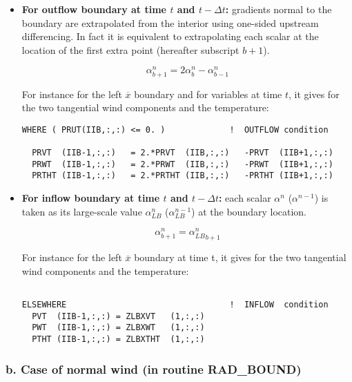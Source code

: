 \begin{itemize}
\item {\bf For outflow boundary at time $t$ and $t - \Delta t$:} gradients
normal to the boundary are
extrapolated from the interior using one-sided upstream differencing. In
fact it is equivalent to extrapolating each scalar at the location of the
first extra point (hereafter subscript $b+1$).

\begin{equation}
\label{inflow}
\alpha^{n}_{b+1} = 2 \alpha^{n}_b -  \alpha^{n}_{b-1}
\end{equation}

 For instance for the left $\overline x$ boundary and for variables at time $t$,
it gives for the two
tangential wind components and the temperature:
\begin{verbatim}
WHERE ( PRUT(IIB,:,:) <= 0. )             !  OUTFLOW condition

  PRVT  (IIB-1,:,:)   = 2.*PRVT  (IIB,:,:)   -PRVT  (IIB+1,:,:)
  PRWT  (IIB-1,:,:)   = 2.*PRWT  (IIB,:,:)   -PRWT  (IIB+1,:,:)
  PRTHT (IIB-1,:,:)   = 2.*PRTHT (IIB,:,:)   -PRTHT (IIB+1,:,:)
\end{verbatim}

\item {\bf For inflow boundary at time $t$ and $t - \Delta t$:}
each scalar $\alpha^{n}$ ($\alpha^{n-1}$) is taken as its large-scale value
$\alpha^{n}_{LB}$ ($\alpha^{n-1}_{LB}$) at the boundary location.

\begin{equation}
\label{inflow}
\alpha^{n}_{b+1} =  {\alpha^{n}_{LB}}_{b+1}
\end{equation}

 For instance for the left $\overline x$ boundary at time t, it gives for the
two tangential wind components and the temperature:

\begin{verbatim}

ELSEWHERE                                 !  INFLOW  condition
  PVT  (IIB-1,:,:) = ZLBXVT   (1,:,:)
  PWT  (IIB-1,:,:) = ZLBXWT   (1,:,:)
  PTHT (IIB-1,:,:) = ZLBXTHT  (1,:,:)
\end{verbatim}

\end{itemize}

\subsubsection{b. Case of normal wind (in routine RAD\_BOUND)}

